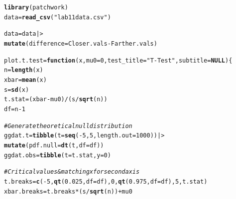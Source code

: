 \documentclass{article}\usepackage[]{graphicx}\usepackage[]{xcolor}
\makeatletter
\newcommand{\hlnum}[1]{\textcolor[rgb]{0.686,0.059,0.569}{#1}}%
\newcommand{\hlsng}[1]{\textcolor[rgb]{0.192,0.494,0.8}{#1}}%
\newcommand{\hlcom}[1]{\textcolor[rgb]{0.678,0.584,0.686}{\textit{#1}}}%
\newcommand{\hlopt}[1]{\textcolor[rgb]{0,0,0}{#1}}%
\newcommand{\hldef}[1]{\textcolor[rgb]{0.345,0.345,0.345}{#1}}%
\newcommand{\hlkwa}[1]{\textcolor[rgb]{0.161,0.373,0.58}{\textbf{#1}}}%
\newcommand{\hlkwb}[1]{\textcolor[rgb]{0.69,0.353,0.396}{#1}}%
\newcommand{\hlkwc}[1]{\textcolor[rgb]{0.333,0.667,0.333}{#1}}%
\newcommand{\hlkwd}[1]{\textcolor[rgb]{0.737,0.353,0.396}{\textbf{#1}}}%
\newenvironment{kframe}{%
 \def\at@end@of@kframe{}%
 \ifinner\ifhmode%
  \def\at@end@of@kframe{\end{minipage}}%
  \begin{minipage}{\columnwidth}%
 \fi\fi%
 \def\FrameCommand##1{\hskip\@totalleftmargin \hskip-\fboxsep
 \colorbox{shadecolor}{##1}\hskip-\fboxsep
     \hskip-\linewidth \hskip-\@totalleftmargin \hskip\columnwidth}%
 \MakeFramed {\advance\hsize-\width
   \@totalleftmargin\z@ \linewidth\hsize
   \@setminipage}}%
 {\par\unskip\endMakeFramed%
 \at@end@of@kframe}
\newenvironment{knitrout}{}{} %
\makeatother
\begin{document}
\begin{knitrout}
\color{fgcolor}\begin{kframe}
\begin{alltt}
\hlkwd{library}\hldef{(patchwork)}
\hldef{data} \hlkwb{=} \hlkwd{read_csv}\hldef{(}\hlsng{"lab11data.csv"}\hldef{)}

\hldef{data} \hlkwb{=} \hldef{data |>}
  \hlkwd{mutate}\hldef{(}\hlkwc{difference} \hldef{= Closer.vals} \hlopt{-} \hldef{Farther.vals)}

\hldef{plot.t.test} \hlkwb{=} \hlkwa{function}\hldef{(}\hlkwc{x}\hldef{,} \hlkwc{mu0} \hldef{=} \hlnum{0}\hldef{,} \hlkwc{test_title} \hldef{=} \hlsng{"T-Test"}\hldef{,} \hlkwc{subtitle} \hldef{=} \hlkwa{NULL}\hldef{) \{}
  \hldef{n} \hlkwb{=} \hlkwd{length}\hldef{(x)}
  \hldef{xbar} \hlkwb{=} \hlkwd{mean}\hldef{(x)}
  \hldef{s} \hlkwb{=} \hlkwd{sd}\hldef{(x)}
  \hldef{t.stat} \hlkwb{=} \hldef{(xbar} \hlopt{-} \hldef{mu0)} \hlopt{/} \hldef{(s} \hlopt{/} \hlkwd{sqrt}\hldef{(n))}
  \hldef{df} \hlkwb{=} \hldef{n} \hlopt{-} \hlnum{1}

  \hlcom{# Generate theoretical null distribution}
  \hldef{ggdat.t} \hlkwb{=} \hlkwd{tibble}\hldef{(}\hlkwc{t} \hldef{=} \hlkwd{seq}\hldef{(}\hlopt{-}\hlnum{5}\hldef{,} \hlnum{5}\hldef{,} \hlkwc{length.out} \hldef{=} \hlnum{1000}\hldef{)) |>}
    \hlkwd{mutate}\hldef{(}\hlkwc{pdf.null} \hldef{=} \hlkwd{dt}\hldef{(t,} \hlkwc{df} \hldef{= df))}
  \hldef{ggdat.obs} \hlkwb{=} \hlkwd{tibble}\hldef{(}\hlkwc{t} \hldef{= t.stat,} \hlkwc{y} \hldef{=} \hlnum{0}\hldef{)}

  \hlcom{# Critical values & matching x for second axis}
  \hldef{t.breaks} \hlkwb{=} \hlkwd{c}\hldef{(}\hlopt{-}\hlnum{5}\hldef{,} \hlkwd{qt}\hldef{(}\hlnum{0.025}\hldef{,} \hlkwc{df} \hldef{= df),} \hlnum{0}\hldef{,} \hlkwd{qt}\hldef{(}\hlnum{0.975}\hldef{,} \hlkwc{df} \hldef{= df),} \hlnum{5}\hldef{, t.stat)}
  \hldef{xbar.breaks} \hlkwb{=} \hldef{t.breaks} \hlopt{*} \hldef{(s} \hlopt{/} \hlkwd{sqrt}\hldef{(n))} \hlopt{+} \hldef{mu0}


\end{alltt}
\end{kframe}
\end{knitrout}
\end{document}
